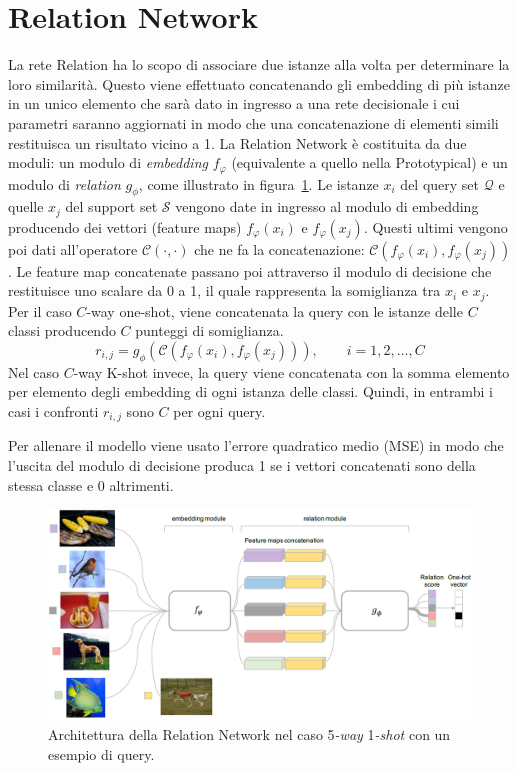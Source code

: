 \documentclass[12pt,a4paper,titlepage]{article}
\begin{document}
\section{Relation Network}
La rete Relation ha lo scopo di associare due istanze alla volta per determinare la loro similarità.
Questo viene effettuato concatenando gli embedding di più istanze in un unico elemento che sarà dato in ingresso a una rete decisionale i cui parametri saranno aggiornati in modo che una concatenazione di elementi simili restituisca un risultato vicino a 1.
La Relation Network è costituita da due moduli: un modulo di \emph{embedding} $f_\varphi$ (equivalente a quello nella Prototypical) e un modulo di \emph{relation} $g_\phi$, come illustrato in figura~\ref{fig:relation_network}.
Le istanze $x_i$ del query set $\mathcal{Q}$ e quelle $x_j$ del support set $\mathcal{S}$ vengono date in ingresso al modulo di embedding producendo dei vettori (feature maps) $f_\varphi(x_i)$ e $f_\varphi(x_j)$.
Questi ultimi vengono poi dati all'operatore $\mathcal{C}(\cdot ,\cdot)$ che ne fa la concatenazione: $\mathcal{C}(f_\varphi(x_i),f_\varphi(x_j))$.
Le feature map concatenate passano poi attraverso il modulo di decisione che restituisce uno scalare da 0 a 1, il quale rappresenta la somiglianza tra $x_i$ e $x_j$.
Per il caso $C$-way one-shot, viene concatenata la query con le istanze delle $C$ classi producendo $C$ punteggi di somiglianza.
\begin{equation}
	r_{i,j}=g_\phi(\mathcal{C}(f_\varphi(x_i),f_\varphi(x_j))),  \qquad i = 1, 2, \dots, C
\end{equation}
Nel caso $C$-way K-shot invece, la query viene concatenata con la somma elemento per elemento degli embedding di ogni istanza delle classi. Quindi, in entrambi i casi i confronti $r_{i,j}$ sono $C$ per ogni query.

Per allenare il modello viene usato l'errore quadratico medio (MSE) in modo che l'uscita del modulo di decisione produca 1 se i vettori concatenati sono della stessa classe e 0 altrimenti.

\begin{figure}[h]
	\centering	
	\includegraphics[width=.8\textwidth]{Immagini/relation_network}
	\caption{Architettura della Relation Network nel caso 5\emph{-way} 1\emph{-shot} con un esempio di query.~\cite{DBLP:journals/corr/abs-1711-06025}}
	\label{fig:relation_network}
\end{figure}
\end{document}
